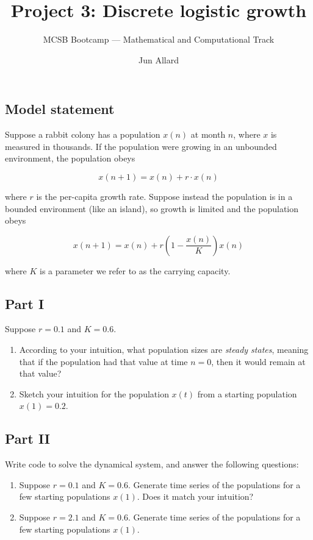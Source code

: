 \documentclass[
  letterpaper,
  DIV=11,
  numbers=noendperiod]{scrartcl}
\title{Project 3: Discrete logistic growth}
\subtitle{MCSB Bootcamp --- Mathematical and Computational Track}
\author{Jun Allard}
\date{}
\providecommand{\tightlist}{%
  \setlength{\itemsep}{0pt}\setlength{\parskip}{0pt}}
\begin{document}
\maketitle


\subsection{Model statement}\label{model-statement}

Suppose a rabbit colony has a population \(x(n)\) at month \(n\), where
\(x\) is measured in thousands. If the population were growing in an
unbounded environment, the population obeys

\[x(n+1) = x(n) + r \cdot x(n)\]

where \(r\) is the per-capita growth rate. Suppose instead the
population is in a bounded environment (like an island), so growth is
limited and the population obeys

\[x(n+1) = x(n) + r \left( 1 - \frac{x(n)}{K}\right) x(n)\]

where \(K\) is a parameter we refer to as the carrying capacity.

\subsection{Part I}\label{part-i}

Suppose \(r=0.1\) and \(K=0.6\).

\begin{enumerate}
\def\labelenumi{\alph{enumi}.}
\tightlist
\item
  According to your intuition, what population sizes are \emph{steady
  states}, meaning that if the population had that value at time
  \(n=0\), then it would remain at that value?
\item
  Sketch your intuition for the population \(x(t)\) from a starting
  population \(x(1)=0.2\).
\end{enumerate}

\subsection{Part II}\label{part-ii}

Write code to solve the dynamical system, and answer the following
questions:

\begin{enumerate}
\def\labelenumi{\alph{enumi}.}
\setcounter{enumi}{2}
\tightlist
\item
  Suppose \(r=0.1\) and \(K=0.6\). Generate time series of the
  populations for a few starting populations \(x(1)\). Does it match
  your intuition?
\item
  Suppose \(r=2.1\) and \(K=0.6\). Generate time series of the
  populations for a few starting populations \(x(1)\).
\end{enumerate}
\end{document}
